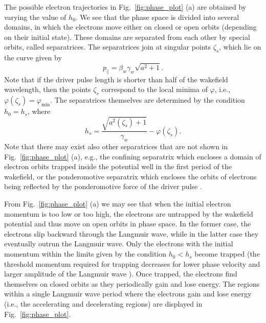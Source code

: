 \documentclass[10pt, a4paper, twoside, openright]{report}
\begin{document}
The possible electron trajectories in Fig.~\ref{fig:phase_plot} (a) are obtained by varying the value of $ h_0 $. We see that the phase space is divided into several domains, in which the electrons move either on closed or open orbits (depending on their initial state). These domains are separated from each other by special orbits, called separatrices. The separatrices join at singular points $ \zeta_s $, which lie on the curve given by \cite{Esirkepov2006}
\begin{equation}\label{eq:singular_points}
	p_{\parallel} = \beta_w \gamma_w \sqrt{a^2 + 1}.
\end{equation}
Note that if the driver pulse length is shorter than half of the wakefield wavelength, then the points $ \zeta_s $ correspond to the local minima of $ \varphi $, i.e., $ \varphi \left( \zeta_s \right) = \varphi_{\mathrm{min}} $. The separatrices themselves are determined by the condition $ h_0 = h_s $, where \cite{Esirkepov2006, Schroeder2006, Esarey2009}
\begin{equation}\label{eq:separatrix}
	h_s = \frac{\sqrt{a^2 \left( \zeta_{s} \right) + 1}}{\gamma_w} - \varphi \left( \zeta_{s} \right).
\end{equation}
Note that there may exist also other separatrices that are not shown in Fig.~\ref{fig:phase_plot} (a), e.g., the confining separatrix which encloses a domain of electron orbits trapped inside the potential well in the first period of the wakefield, or the ponderomotive separatrix which encloses the orbits of electrons being reflected by the ponderomotive force of the driver pulse \cite{Esirkepov2006}.

From Fig.~\ref{fig:phase_plot} (a) we may see that when the initial electron momentum is too low or too high, the electrons are untrapped by the wakefield potential and thus move on open orbits in phase space. In the former case, the electrons slip backward through the Langmuir wave, while in the latter case they eventually outrun the Langmuir wave. Only the electrons with the initial momentum within the limits given by the condition $ h_0 < h_s $ become trapped (the threshold momentum required for trapping decreases for lower phase velocity and larger amplitude of the Langmuir wave \cite{Schroeder2006}). Once trapped, the electrons find themselves on closed orbits as they periodically gain and lose energy. The regions within a single Langmuir wave period where the electrons gain and lose energy (i.e., the accelerating and decelerating regions) are displayed in Fig.~\ref{fig:phase_plot}. 
\end{document}
